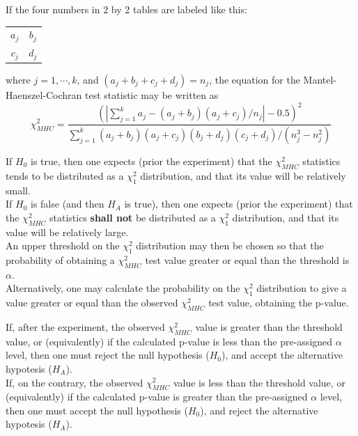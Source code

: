 \begin{frame}
  \vspace{.5cm}
  If the four numbers in 2 by 2 tables are labeled like this:\\
  \begin{center}
    \begin{tabular}{cc}
      $a_j$ & $b_j$\\
      $c_j$ & $d_j$\\
    \end{tabular}
  \end{center}
  \vspace{.25cm}
  where $j=1, \cdots, k$, and $(a_j+b_j+c_j+d_j)=n_j$, the equation for the Mantel-Haenszel-Cochran test statistic may be written as\\
  $$\chi^2_{MHC}=\dfrac{\left(\left|\sum_{j=1}^k a_j-(a_j+b_j)(a_j+c_j)/n_j\right|-0.5\right)^2}{\sum_{j=1}^k (a_j+b_j)(a_j+c_j)(b_j+d_j)(c_j+d_j)/(n_j^3-n_j^2)}$$
\end{frame}

\begin{frame}
  \vspace{0.25cm}
  If $H_0$ is true, then one expects (prior the experiment) that the $\chi^2_{MHC}$ statistics tends to be distributed as a $\chi_1^2$ distribution, and that its value will be relatively small.\\
  \vspace{0.25cm}
  If $H_0$ is false (and then $H_A$ is true), then one expects (prior the experiment) that the $\chi^2_{MHC}$ statistics \textbf{shall not} be distributed as a $\chi_1^2$ distribution, and that its value will be relatively large.\\
  \vspace{0.25cm}
  An upper threshold on the $\chi_1^2$ distribution may then be chosen so that the probability of obtaining a $\chi^2_{MHC}$ test value greater or equal than the threshold is $\alpha$.\\
  \vspace{0.25cm}
  Alternatively, one may calculate the probability on the $\chi_1^2$ distribution to give a value greater or equal than the observed  $\chi^2_{MHC}$ test value, obtaining the  p-value.
\end{frame}

\begin{frame}
  \vspace{0.5cm}
  If, after the experiment, the observed $\chi^2_{MHC}$ value is greater than the threshold value, or (equivalently) if the calculated p-value is less than the pre-assigned $\alpha$ level, then one must reject the null hypothesis ($H_0$), and accept the alternative hypotesis ($H_A$).\\
  \vspace{1cm}
  If, on the contrary, the observed $\chi^2_{MHC}$ value is less than the threshold value, or (equivalently) if the calculated p-value is greater than the pre-assigned $\alpha$ level, then one must accept the null hypothesis ($H_0$), and reject the alternative hypotesis ($H_A$).
\end{frame}

